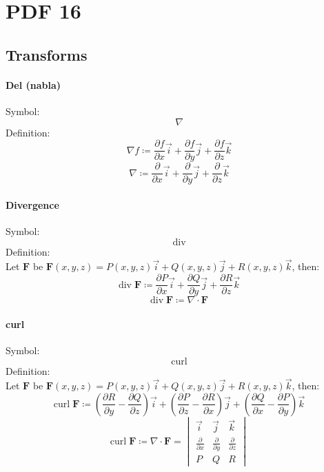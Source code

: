 \documentclass[12pt, fleqn]{book}
\newcommand{\F}{\mathbf{F}}
\newcommand{\Curl}{\mathrm{curl}}
\newcommand{\Div}{\mathrm{div}}
\newcommand{\xyz}{(x, y, z)}
\newcommand{\rond}[2]{\frac{\partial #1}{\partial #2}}
\begin{document}
\chapter{PDF 16}\label{pdf16}
	\section{Transforms}
		\subsubsection{Del (nabla)}
			Symbol:
			\begin{equation}
				\nabla
			\end{equation}
			Definition:
			\begin{equation}
				\nabla f \coloneqq \rond{f}{x}\vec{i} + \rond{f}{y}\vec{j} + \rond{f}{z}\vec{k}
			\end{equation}
		    \begin{equation}
		    	\nabla \coloneqq \rond{}{x}\vec{i} + \rond{}{y}\vec{j} + \rond{}{z}\vec{k}
		    \end{equation}
	    \subsubsection{Divergence}
	    	Symbol:
	    	\begin{equation}
	    		\Div
	    	\end{equation}
    		Definition: \\
    		Let $\F$ be $\F\xyz = P\xyz\vec{i} + Q\xyz\vec{j} + R\xyz\vec{k}$, then:
    		\begin{equation}
    			\Div \; \F \coloneqq \rond{P}{x}\vec{i} + \rond{Q}{y}\vec{j} + \rond{R}{z}\vec{k}
    		\end{equation}
    		\begin{equation}
    			\Div \; \F \coloneqq \nabla \cdot \F
    		\end{equation}
    	\subsubsection{curl}
    		Symbol:
    		\begin{equation}
    			\Curl
    		\end{equation}
    		Definition: \\
    		Let $\F$ be $\F\xyz = P\xyz\vec{i} + Q\xyz\vec{j} + R\xyz\vec{k}$, then:
    		\begin{equation}
    			\Curl \; \F \coloneqq (\rond{R}{y} - \rond{Q}{z})\vec{i} + (\rond{P}{z} - \rond{R}{x})\vec{j} + (\rond{Q}{x} - \rond{P}{y})\vec{k} 
     		\end{equation}
     		\begin{equation}
     			\Curl \; \F \coloneqq \nabla \cdot \F = 
     			\begin{vmatrix}
     				\vec{i} & \vec{j} & \vec{k} \\
     				\rond{}{x} &  \rond{}{y} & \rond{}{z} \\
     				P & Q & R
     			\end{vmatrix}
     		\end{equation}
\end{document}
